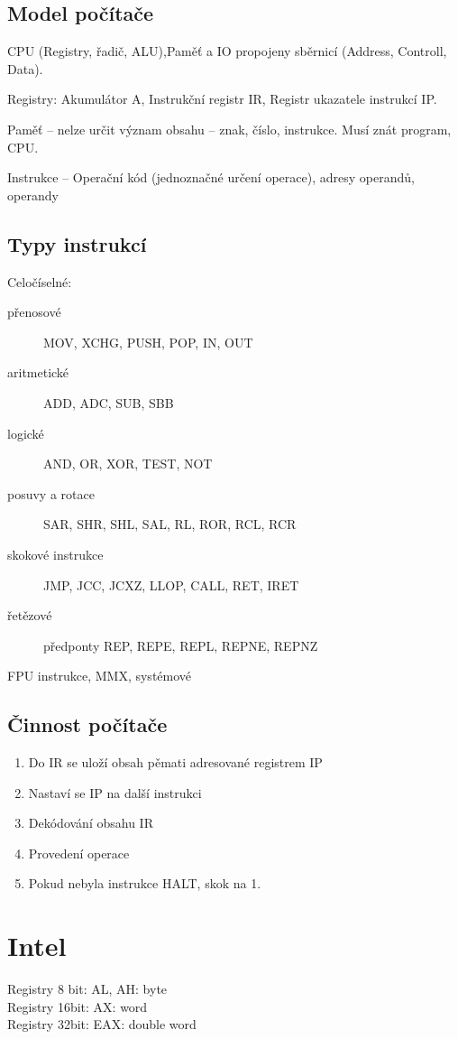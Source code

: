 \documentclass[a4wide]{report}
\begin{document}
\subsection{Model počítače}
CPU (Registry, řadič, ALU),Paměť a IO propojeny sběrnicí (Address, Controll, Data).

Registry: Akumulátor A, Instrukční registr IR, Registr ukazatele instrukcí IP.

Paměť -- nelze určit význam obsahu -- znak, číslo, instrukce. Musí znát program, CPU.

Instrukce -- Operační kód (jednoznačné určení operace), adresy operandů, operandy

\subsection{Typy instrukcí}
Celočíselné:
\begin{description}
	\item[přenosové] MOV, XCHG, PUSH, POP, IN, OUT
	\item[aritmetické] ADD, ADC, SUB, SBB
	\item[logické] AND, OR, XOR, TEST, NOT
	\item[posuvy a rotace] SAR, SHR, SHL, SAL, RL, ROR, RCL, RCR
	\item[skokové instrukce] JMP, JCC, JCXZ, LLOP, CALL, RET, IRET
	\item[řetězové] předponty REP, REPE, REPL, REPNE, REPNZ
\end{description}
FPU instrukce, MMX, systémové

\subsection{Činnost počítače}
\begin{enumerate}
	\item Do IR se uloží obsah pěmati adresované registrem IP
	\item Nastaví se IP na další instrukci
	\item Dekódování obsahu IR
	\item Provedení operace
	\item Pokud nebyla instrukce HALT, skok na 1.
\end{enumerate}

\section{Intel}

Registry 8 bit: AL, AH: byte\\
Registry 16bit: AX: word\\
Registry 32bit: EAX: double word
\end{document}
